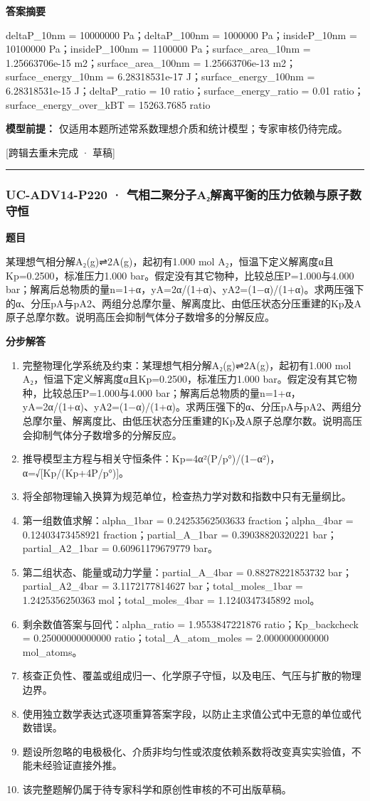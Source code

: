 \documentclass[UTF8,11pt,a4paper]{ctexart}
\begin{document}
\noindent\textbf{答案摘要}\par
deltaP\_10nm = 10000000 Pa；deltaP\_100nm = 1000000 Pa；insideP\_10nm = 10100000 Pa；insideP\_100nm = 1100000 Pa；surface\_area\_10nm = 1.25663706e-15 m2；surface\_area\_100nm = 1.25663706e-13 m2；surface\_energy\_10nm = 6.28318531e-17 J；surface\_energy\_100nm = 6.28318531e-15 J；deltaP\_ratio = 10 ratio；surface\_energy\_ratio = 0.01 ratio；surface\_energy\_over\_kBT = 15263.7685 ratio\par
\noindent\textbf{模型前提：}
仅适用本题所述常系数理想介质和统计模型；专家审核仍待完成。\par
\noindent\textcolor{red!65!black}{[跨辑去重未完成 · 草稿]} \par
\medskip\hrule\medskip
{}
\subsubsection*{UC-ADV14-P220 · 气相二聚分子A₂解离平衡的压力依赖与原子数守恒}
\noindent\textbf{题目}\par
某理想气相分解A₂(g)⇌2A(g)，起初有1.000 mol A₂，恒温下定义解离度α且Kp=0.2500，标准压力1.000 bar。假定没有其它物种，比较总压P=1.000与4.000 bar；解离后总物质的量n=1+α，yA=2α/(1+α)、yA2=(1−α)/(1+α)。求两压强下的α、分压pA与pA2、两组分总摩尔量、解离度比、由低压状态分压重建的Kp及A原子总摩尔数。说明高压会抑制气体分子数增多的分解反应。\par
\medskip\noindent\textbf{分步解答}
\begin{enumerate}
\item 完整物理化学系统及约束：某理想气相分解A₂(g)⇌2A(g)，起初有1.000 mol A₂，恒温下定义解离度α且Kp=0.2500，标准压力1.000 bar。假定没有其它物种，比较总压P=1.000与4.000 bar；解离后总物质的量n=1+α，yA=2α/(1+α)、yA2=(1−α)/(1+α)。求两压强下的α、分压pA与pA2、两组分总摩尔量、解离度比、由低压状态分压重建的Kp及A原子总摩尔数。说明高压会抑制气体分子数增多的分解反应。
\item 推导模型主方程与相关守恒条件：Kp=4α²(P/p°)/(1−α²)，α=√[Kp/(Kp+4P/p°)]。
\item 将全部物理输入换算为规范单位，检查热力学对数和指数中只有无量纲比。
\item 第一组数值求解：alpha\_1bar = 0.24253562503633 fraction；alpha\_4bar = 0.12403473458921 fraction；partial\_A\_1bar = 0.39038820320221 bar；partial\_A2\_1bar = 0.60961179679779 bar。
\item 第二组状态、能量或动力学量：partial\_A\_4bar = 0.88278221853732 bar；partial\_A2\_4bar = 3.1172177814627 bar；total\_moles\_1bar = 1.2425356250363 mol；total\_moles\_4bar = 1.1240347345892 mol。
\item 剩余数值答案与回代：alpha\_ratio = 1.9553847221876 ratio；Kp\_backcheck = 0.25000000000000 ratio；total\_A\_atom\_moles = 2.0000000000000 mol\_atoms。
\item 核查正负性、覆盖或组成归一、化学原子守恒，以及电压、气压与扩散的物理边界。
\item 使用独立数学表达式逐项重算答案字段，以防止主求值公式中无意的单位或代数错误。
\item 题设所忽略的电极极化、介质非均匀性或浓度依赖系数将改变真实实验值，不能未经验证直接外推。
\item 该完整题解仍属于待专家科学和原创性审核的不可出版草稿。
\end{enumerate}
\end{document}

